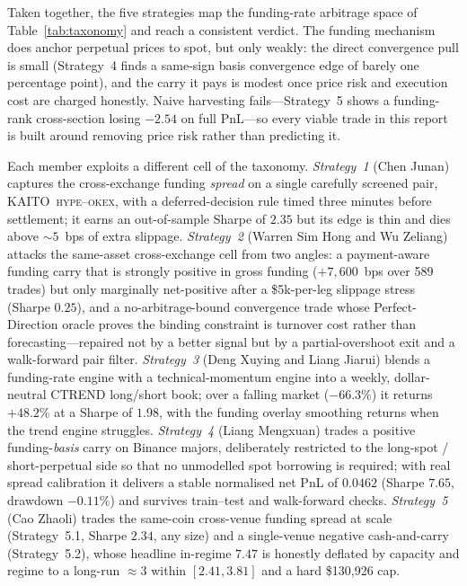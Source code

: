 \documentclass[10pt,twocolumn,a4paper]{article}
\begin{document}
Taken together, the five strategies map the funding-rate arbitrage space
of Table~\ref{tab:taxonomy} and reach a consistent verdict.  The funding
mechanism does anchor perpetual prices to spot, but only weakly: the
direct convergence pull is small (Strategy~4 finds a same-sign basis
convergence edge of barely one percentage point), and the carry it pays is
modest once price risk and execution cost are charged honestly.  Naive
harvesting fails---Strategy~5 shows a funding-rank cross-section losing
$-2.54$ on full PnL---so every viable trade in this report is built around
removing price risk rather than predicting it.

Each member exploits a different cell of the taxonomy.
\emph{Strategy~1} (Chen Junan) captures the cross-exchange funding
\emph{spread} on a single carefully screened pair,
KAITO~\textsc{hype}--\textsc{okex}, with a deferred-decision rule timed
three minutes before settlement; it earns an out-of-sample Sharpe of
$2.35$ but its edge is thin and dies above $\sim 5$~bps of extra slippage.
\emph{Strategy~2} (Warren Sim Hong and Wu Zeliang) attacks the same-asset
cross-exchange cell from two angles: a payment-aware funding carry that is
strongly positive in gross funding ($+7{,}600$~bps over 589 trades) but
only marginally net-positive after a \$5k-per-leg slippage stress (Sharpe
$0.25$), and a no-arbitrage-bound convergence trade whose Perfect-Direction
oracle proves the binding constraint is turnover cost rather than
forecasting---repaired not by a better signal but by a partial-overshoot
exit and a walk-forward pair filter.  \emph{Strategy~3} (Deng Xuying and
Liang Jiarui) blends a funding-rate
engine with a technical-momentum engine into a weekly, dollar-neutral
CTREND long/short book; over a falling market ($-66.3\%$) it returns
$+48.2\%$ at a Sharpe of $1.98$, with the funding overlay smoothing returns
when the trend engine struggles.  \emph{Strategy~4} (Liang Mengxuan) trades
a positive funding-\emph{basis} carry on Binance majors, deliberately
restricted to the long-spot / short-perpetual side so that no unmodelled
spot borrowing is required; with real spread calibration it delivers a
stable normalised net PnL of $0.0462$ (Sharpe $7.65$, drawdown $-0.11\%$)
and survives train--test and walk-forward checks.  \emph{Strategy~5} (Cao
Zhaoli) trades the same-coin cross-venue funding spread at scale
(Strategy~5.1, Sharpe $2.34$, any size) and a single-venue negative
cash-and-carry (Strategy~5.2), whose headline in-regime $7.47$ is honestly
deflated by capacity and regime to a long-run $\approx 3$ within
$[2.41, 3.81]$ and a hard \$130{,}926 cap.
\end{document}
